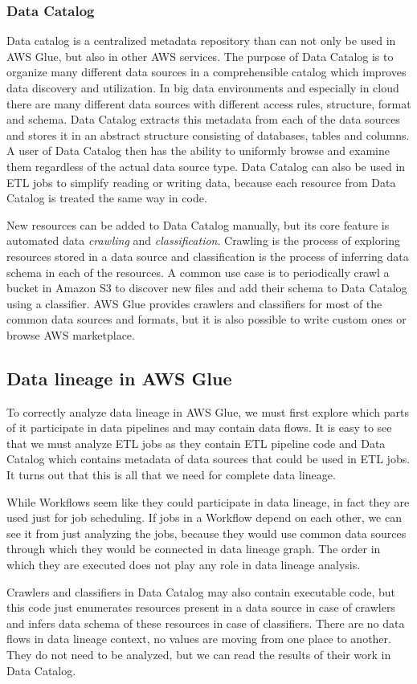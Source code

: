 \subsubsection{Data Catalog}
Data catalog is a centralized metadata repository than can not only be used in AWS Glue, but also in other AWS services. The purpose of Data Catalog is to organize many different data sources in a comprehensible catalog which improves data discovery and utilization. In big data environments and especially in cloud there are many different data sources with different access rules, structure, format and schema. Data Catalog extracts this metadata from each of the data sources and stores it in an abstract structure consisting of databases, tables and columns. A user of Data Catalog then has the ability to uniformly browse and examine them regardless of the actual data source type. Data Catalog can also be used in ETL jobs to simplify reading or writing data, because each resource from Data Catalog is treated the same way in code.
\par
New resources can be added to Data Catalog manually, but its core feature is automated data \textit{crawling} and \textit{classification}. Crawling is the process of exploring resources stored in a data source and classification is the process of inferring data schema in each of the resources. A common use case is to periodically crawl a bucket in Amazon S3 to discover new files and add their schema to Data Catalog using a classifier. AWS Glue provides crawlers and classifiers for most of the common data sources and formats, but it is also possible to write custom ones or browse AWS marketplace.

\subsection{Data lineage in AWS Glue}
To correctly analyze data lineage in AWS Glue, we must first explore which parts of it participate in data pipelines and may contain data flows. It is easy to see that we must analyze ETL jobs as they contain ETL pipeline code and Data Catalog which contains metadata of data sources that could be used in ETL jobs. It turns out that this is all that we need for complete data lineage.
\par
While Workflows seem like they could participate in data lineage, in fact they are used just for job scheduling. If jobs in a Workflow depend on each other, we can see it from just analyzing the jobs, because they would use common data sources through which they would be connected in data lineage graph. The order in which they are executed does not play any role in data lineage analysis.
\par
Crawlers and classifiers in Data Catalog may also contain executable code, but this code just enumerates resources present in a data source in case of crawlers and infers data schema of these resources in case of classifiers. There are no data flows in data lineage context, no values are moving from one place to another. They do not need to be analyzed, but we can read the results of their work in Data Catalog.


